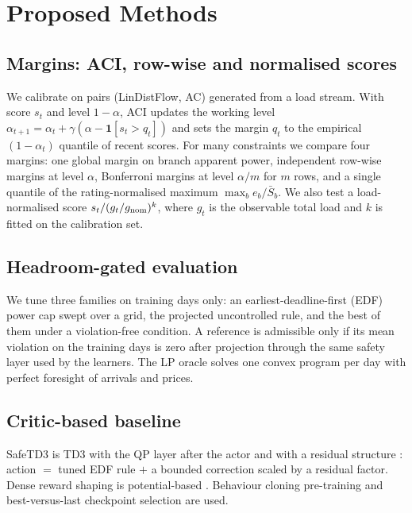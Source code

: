\documentclass[11pt]{article}
\begin{document}
\section{Proposed Methods}
\subsection{Margins: ACI, row-wise and normalised scores}\label{sec:mmargin}
We calibrate on pairs (LinDistFlow, AC) generated from a load stream. With score $s_t$ and level $1-\alpha$, ACI updates the working level $\alpha_{t+1}=\alpha_t+\gamma(\alpha-\mathbf 1[s_t>q_t])$ and sets the margin $q_t$ to the empirical $(1-\alpha_t)$ quantile of recent scores. For many constraints we compare four margins: one global margin on branch apparent power, independent row-wise margins at level $\alpha$, Bonferroni margins at level $\alpha/m$ for $m$ rows, and a single quantile of the rating-normalised maximum $\max_b e_b/\bar S_b$. We also test a load-normalised score $s_t/(g_t/g_{\rm nom})^k$, where $g_t$ is the observable total load and $k$ is fitted on the calibration set.

\subsection{Headroom-gated evaluation}
We tune three families on training days only: an earliest-deadline-first (EDF) power cap swept over a grid, the projected uncontrolled rule, and the best of them under a violation-free condition. A reference is admissible only if its mean violation on the training days is zero after projection through the same safety layer used by the learners. The LP oracle solves one convex program per day with perfect foresight of arrivals and prices.

\subsection{Critic-based baseline}
SafeTD3 is TD3 \cite{td3} with the QP layer after the actor and with a residual structure \cite{johannink,silverres}: action $=$ tuned EDF rule $+$ a bounded correction scaled by a residual factor. Dense reward shaping is potential-based \cite{ng}. Behaviour cloning pre-training and best-versus-last checkpoint selection are used.
\end{document}
